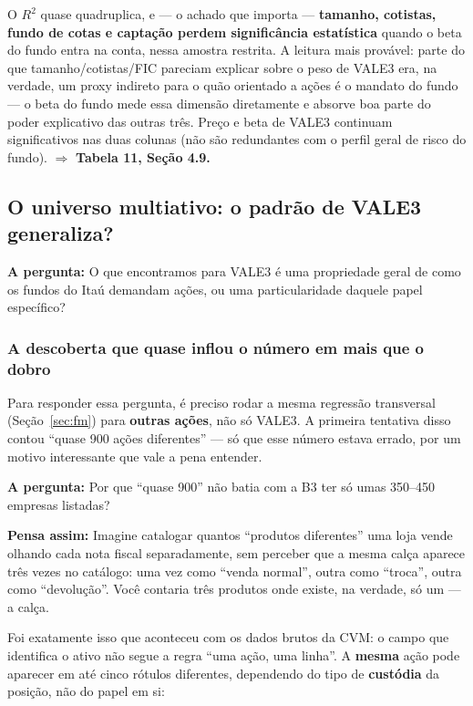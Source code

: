 \documentclass[11pt,a4paper]{article}
\newcommand{\pergunta}[1]{\par\vspace{4pt}\noindent\textbf{\color{azul}A pergunta:} #1\par\vspace{2pt}}
\newcommand{\analogia}[1]{\par\vspace{4pt}\noindent\textbf{\color{verde}Pensa assim:} #1\par\vspace{2pt}}
\begin{document}
O $R^2$ quase quadruplica, e --- o achado que importa --- \textbf{tamanho, cotistas, fundo de
cotas e captação perdem significância estatística} quando o beta do fundo entra na conta, nessa
amostra restrita. A leitura mais provável: parte do que tamanho/cotistas/FIC pareciam explicar
sobre o peso de VALE3 era, na verdade, um proxy indireto para o quão orientado a ações é o
mandato do fundo --- o beta do fundo mede essa dimensão diretamente e absorve boa parte do poder
explicativo das outras três. Preço e beta de VALE3 continuam significativos nas duas colunas
(não são redundantes com o perfil geral de risco do fundo). $\Rightarrow$ \textbf{Tabela 11,
Seção 4.9.}

\subsection{O universo multiativo: o padrão de VALE3 generaliza?}
\label{sec:multi}

\pergunta{O que encontramos para VALE3 é uma propriedade geral de como os fundos do Itaú
demandam ações, ou uma particularidade daquele papel específico?}

\subsubsection*{A descoberta que quase inflou o número em mais que o dobro}

Para responder essa pergunta, é preciso rodar a mesma regressão transversal (Seção~\ref{sec:fm})
para \textbf{outras ações}, não só VALE3. A primeira tentativa disso contou ``quase 900 ações
diferentes'' --- só que esse número estava errado, por um motivo interessante que vale a pena
entender.

\pergunta{Por que ``quase 900'' não batia com a B3 ter só umas 350--450 empresas listadas?}

\analogia{Imagine catalogar quantos ``produtos diferentes'' uma loja vende olhando cada nota
fiscal separadamente, sem perceber que a mesma calça aparece três vezes no catálogo: uma vez como
``venda normal'', outra como ``troca'', outra como ``devolução''. Você contaria três produtos
onde existe, na verdade, só um --- a calça.}

Foi exatamente isso que aconteceu com os dados brutos da CVM: o campo que identifica o ativo não
segue a regra ``uma ação, uma linha''. A \textbf{mesma} ação pode aparecer em até cinco rótulos
diferentes, dependendo do tipo de \textbf{custódia} da posição, não do papel em si:
\end{document}
